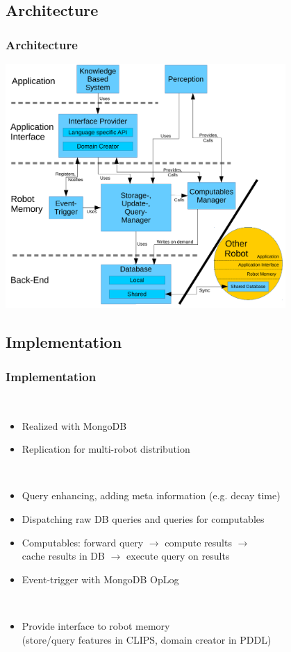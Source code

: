 \subsection{Architecture}
\begin{frame}
  \frametitle{Architecture}
  \center
  \includegraphics[width=0.8\textwidth]{../architecture.pdf}
\end{frame}

\subsection{Implementation}
\begin{frame}
  \frametitle{Implementation}
  \begin{description}[]
  \item[Back-End] \hfill \\
    \begin{itemize}
    \item Realized with MongoDB
    \item Replication for multi-robot distribution
    \end{itemize}
  \smallskip
  \item[Robot Memory] \hfill \\
    \begin{itemize}
    \item Query enhancing, adding meta information (e.g. decay time)
    \item Dispatching raw DB queries and queries for computables
    \item Computables: forward query $\rightarrow$ compute results $\rightarrow$ \\
          cache results in DB $\rightarrow$ execute query on results
    \item Event-trigger with MongoDB OpLog
    \end{itemize}
  \smallskip
  \item[Planner/Reasoner] \hfill \\
    \begin{itemize}
    \item Provide interface to robot memory\\
          (store/query features in CLIPS, domain creator in PDDL)
    \end{itemize}
  \end{description}  
\end{frame}

